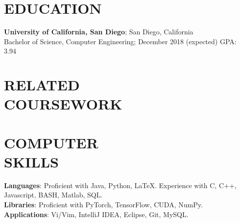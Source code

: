 \documentclass[margin]{res}
\begin{document}
\begin{resume}

\section{EDUCATION}
\textbf{University of California, San Diego}; San Diego, California\\
Bachelor of Science, Computer Engineering; December 2018 (expected)\hfill 
GPA: 3.94

\section{RELATED\\COURSEWORK}
%



\section{COMPUTER\\SKILLS}

\textbf{Languages}: 
Proficient with Java, Python, \LaTeX.
Experience with C, C++, Javascript, BASH, Matlab, SQL.
\\
\textbf{Libraries}: 
Proficient with PyTorch, TensorFlow, CUDA, NumPy.
\\
\textbf{Applications}: Vi/Vim, IntelliJ IDEA, Eclipse, Git, MySQL. 


\end{resume}
\end{document}
